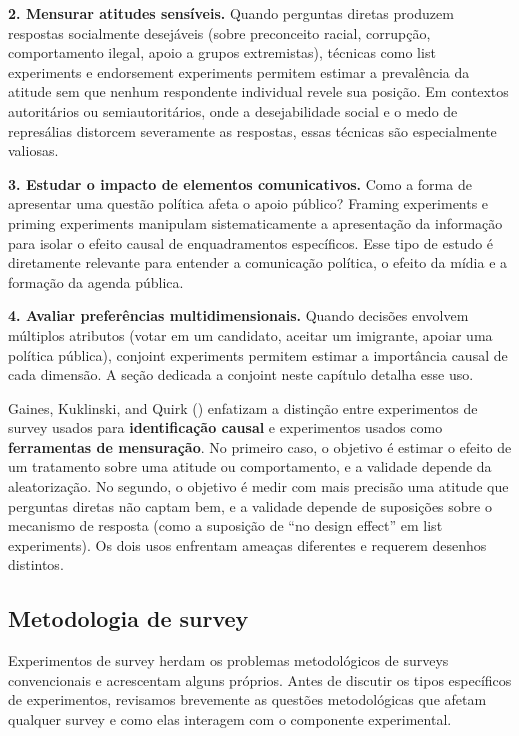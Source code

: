 \documentclass[
]{article}
\begin{document}
\textbf{2. Mensurar atitudes sensíveis.} Quando perguntas diretas produzem respostas socialmente desejáveis (sobre preconceito racial, corrupção, comportamento ilegal, apoio a grupos extremistas), técnicas como list experiments e endorsement experiments permitem estimar a prevalência da atitude sem que nenhum respondente individual revele sua posição. Em contextos autoritários ou semiautoritários, onde a desejabilidade social e o medo de represálias distorcem severamente as respostas, essas técnicas são especialmente valiosas.

\textbf{3. Estudar o impacto de elementos comunicativos.} Como a forma de apresentar uma questão política afeta o apoio público? Framing experiments e priming experiments manipulam sistematicamente a apresentação da informação para isolar o efeito causal de enquadramentos específicos. Esse tipo de estudo é diretamente relevante para entender a comunicação política, o efeito da mídia e a formação da agenda pública.

\textbf{4. Avaliar preferências multidimensionais.} Quando decisões envolvem múltiplos atributos (votar em um candidato, aceitar um imigrante, apoiar uma política pública), conjoint experiments permitem estimar a importância causal de cada dimensão. A seção dedicada a conjoint neste capítulo detalha esse uso.

Gaines, Kuklinski, and Quirk () enfatizam a distinção entre experimentos de survey usados para \textbf{identificação causal} e experimentos usados como \textbf{ferramentas de mensuração}. No primeiro caso, o objetivo é estimar o efeito de um tratamento sobre uma atitude ou comportamento, e a validade depende da aleatorização. No segundo, o objetivo é medir com mais precisão uma atitude que perguntas diretas não captam bem, e a validade depende de suposições sobre o mecanismo de resposta (como a suposição de ``no design effect'' em list experiments). Os dois usos enfrentam ameaças diferentes e requerem desenhos distintos.

\subsection{Metodologia de survey}\label{metodologia-de-survey}

Experimentos de survey herdam os problemas metodológicos de surveys convencionais e acrescentam alguns próprios. Antes de discutir os tipos específicos de experimentos, revisamos brevemente as questões metodológicas que afetam qualquer survey e como elas interagem com o componente experimental.
\end{document}
